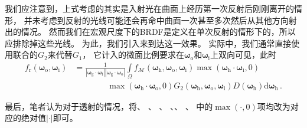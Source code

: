 我们应注意到，上式考虑的其实是入射光在曲面上经历第一次反射后刚刚离开的情形，
并未考虑到反射的光线可能还会再命中曲面一次甚至多次然后从其他方向射出的情况。
然而我们在宏观尺度下的BRDF是定义在单次反射的情形下的，所以应排除掉这些光线。
为此，我们引入来到达这一效果。
实际中，我们通常直接使用联合的$G_2$来代替$G_1$，
它计入的微面比例要求在${\bm\omega}_{\mathrm{o}}$和${\bm\omega}_{\mathrm{i}}$上双向可见，此时
\begin{align}\label{eq:08ex01-MacroBRDFG2}
    f_{\mathrm{r}}({\bm\omega}_{\mathrm{o}},{\bm\omega}_{\mathrm{i}})
     & =\frac{1}{|{\bm\omega}_{\mathrm{g}}\cdot{\bm\omega}_{\mathrm{i}}||{\bm\omega}_{\mathrm{g}}\cdot{\bm\omega}_{\mathrm{o}}|}
    \int\limits_{\varOmega}f_{\mathcal{M}}({\bm\omega}_{\mathrm{h}},{\bm\omega}_{\mathrm{o}},{\bm\omega}_{\mathrm{i}})
    \max({\bm\omega}_{\mathrm{h}}\cdot{\bm\omega}_{\mathrm{i}},0)\nonumber                                                       \\
     & \qquad\qquad\max({\bm\omega}_{\mathrm{h}}\cdot{\bm\omega}_{\mathrm{o}},0)
    G_2({\bm\omega}_{\mathrm{h}},{\bm\omega}_{\mathrm{o}},{\bm\omega}_{\mathrm{i}})
    D({\bm\omega}_{\mathrm{h}})\mathrm{d}{\bm\omega}_{\mathrm{h}}\, .
\end{align}

最后，笔者认为对于透射的情况，将、
、
、
、、
、
中的$\max(\cdot,0)$项均改为对应的绝对值$|\cdot|$即可。

